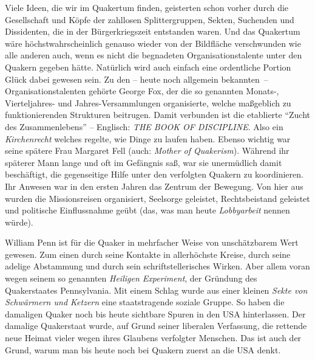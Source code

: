 Viele Ideen, die wir im Quakertum finden, geisterten schon vorher durch die
Gesellschaft und Köpfe der zahllosen Splittergruppen, Sekten, Suchenden und
Dissidenten, die in der Bürgerkriegszeit entstanden waren. Und das Quakertum
wäre höchstwahrscheinlich genauso wieder von der Bildfläche verschwunden wie
alle anderen auch, wenn es nicht die begnadeten Organisationstalente unter den
Quakern gegeben hätte. Natürlich wird auch einfach eine ordentliche Portion
Glück
dabei gewesen sein. Zu den -- heute noch allgemein bekannten~--
Organisationstalenten gehörte George Fox, der die so genannten
Monats-, Vierteljahres- und Jahres-Versammlungen
organisierte, welche maßgeblich zu
funktionierenden
Strukturen beitrugen. Damit verbunden ist die etablierte "`Zucht des
Zusammenlebens"' -- Englisch: \textit{THE BOOK OF DISCIPLINE}. Also ein
\textit{Kirchenrecht} welches
regelte, wie Dinge zu laufen haben. Ebenso wichtig war seine spätere Frau
Margaret Fell (auch: \textit{Mother of
Quakerism}). Während ihr späterer Mann
lange und oft im Gefängnis saß, war sie unermüdlich damit beschäftigt, die
gegenseitige Hilfe unter den verfolgten Quakern zu
koordinieren. Ihr Anwesen
war in den ersten Jahren das Zentrum der Bewegung. Von hier aus wurden die
Missionsreisen organisiert, Seelsorge geleistet,
Rechtsbeistand geleistet und
politische Einflussnahme geübt (das, was man heute
\textit{Lobbyarbeit} nennen
würde).

\medskip

William Penn ist für die Quaker in mehrfacher Weise von unschätzbarem Wert
gewesen.
Zum einen durch seine Kontakte in allerhöchste Kreise, durch seine adelige
Abstammung
und
durch sein schriftstellerisches Wirken. Aber allem voran wegen seinem so
genannten \textit{Heiligen Experiment}, der
Gründung des Quakerstaates
Pennsylvania. Mit einem Schlag wurde aus einer kleinen \textit{Sekte von
Schwärmern und Ketzern} eine staatstragende soziale Gruppe. So haben die
damaligen Quaker noch bis heute sichtbare Spuren in den USA
hinterlassen.
Der damalige Quakerstaat wurde, auf Grund seiner liberalen Verfassung, die
rettende neue Heimat vieler wegen ihres Glaubens verfolgter Menschen. Das ist
auch der Grund, warum man bis heute noch bei Quakern zuerst an die USA denkt.

